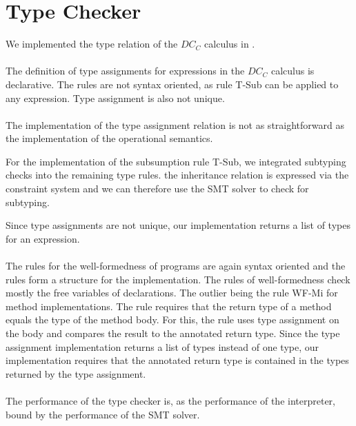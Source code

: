 \section{Type Checker}
We implemented the type relation of the $DC_C$ calculus
in .\\
\\
The definition of type assignments for expressions
in the $DC_C$ calculus is declarative.
The rules are not syntax oriented,
as rule T-Sub can be applied to any expression.
Type assignment is also not unique.\\
\\
The implementation of the type assignment relation
is not as straightforward as the implementation
of the operational semantics.

For the implementation of the subsumption rule T-Sub,
we integrated subtyping checks into the remaining type rules.
the inheritance relation is expressed via the constraint system
and we can therefore use the SMT solver to check for subtyping.

Since type assignments are not unique,
our implementation returns a list of types for
an expression.\\
\\
The rules for the well-formedness of programs are
again syntax oriented
and the rules form a structure for the implementation.
The rules of well-formedness check mostly the free variables
of declarations.
The outlier being the rule WF-Mi for method implementations.
The rule requires that the return type of a method
equals the type of the method body.
For this, the rule uses type assignment on the body
and compares the result to the annotated return type.
Since the type assignment implementation
returns a list of types instead of one type,
our implementation requires that the annotated return type
is contained in the types returned by the type assignment.\\
\\
The performance of the type checker is,
as the performance of the interpreter,
bound by the performance of the SMT solver.
%

